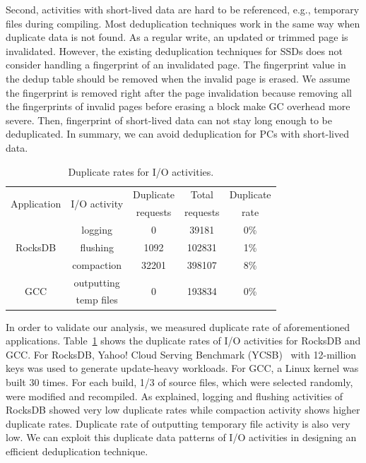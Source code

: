 Second, activities with short-lived data are hard to be referenced, e.g., temporary files during compiling.
Most deduplication techniques work in the same way when duplicate data is not found.
As a regular write, an updated or trimmed page is invalidated.
However, the existing deduplication techniques for SSDs does not consider handling a fingerprint of an invalidated page.
The fingerprint value in the dedup table should be removed when the invalid page is erased.
We assume the fingerprint is removed right after the page invalidation because
removing all the fingerprints of invalid pages before erasing a block make GC overhead more severe.
Then, fingerprint of short-lived data can not stay long enough to be deduplicated.
In summary, we can avoid deduplication for PCs with short-lived data.

\begin{table}[b]
	\centering
	\begin{tabular}{c|c|c|c|c}
		\hline
		 \multirow{2}{*}{Application} & \multirow{2}{*}{I/O activity} & Duplicate & Total & Duplicate \\
									  &                               & requests  & requests & rate \\
		 \hline
		 \hline
		 \multirow{3}{*}{RocksDB} & logging & 0 & 39181 & 0\% \\
								  & flushing & 1092 & 102831 & 1\% \\
								  & compaction & 32201 & 398107 & 8\% \\
	     \hline
		 \multirow{2}{*}{GCC} & outputting & \multirow{2}{*}{0} & \multirow{2}{*}{193834} & \multirow{2}{*}{0\%} \\
							  & temp files &                    &                         & \\
		  \hline
	\end{tabular}
	\caption{Duplicate rates for I/O activities.}
	\label{tab:duprates}
\end{table}

In order to validate our analysis, we measured duplicate rate of aforementioned applications.
Table~\ref{tab:duprates} shows the duplicate rates of I/O activities for RocksDB and GCC. 
For RocksDB, Yahoo! Cloud Serving Benchmark (YCSB)~\cite{YCSB} with 
12-million keys was used to generate update-heavy workloads.
For GCC, a Linux kernel was built 30 times.  For each build, 1/3 of source files, which were
selected randomly, were modified and recompiled.
As explained, logging and flushing activities of RocksDB showed very low duplicate rates
while compaction activity shows higher duplicate rates.
Duplicate rate of outputting temporary file activity is also very low.
We can exploit this duplicate data patterns of I/O activities in designing 
an efficient deduplication technique.
